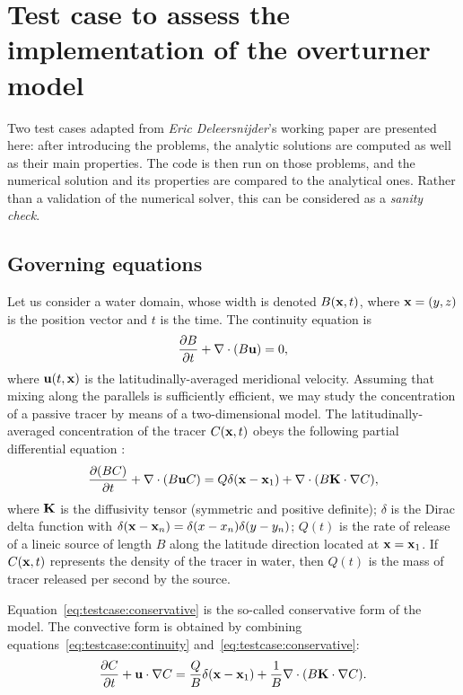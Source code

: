 \section{Test case to assess the implementation of the overturner model} \label{app:test_case}
Two test cases adapted from \textit{Eric Deleersnijder}'s working paper \cite{deleersnijder2011test} are presented here: after introducing the problems, the analytic solutions are computed as well as their main properties. The code is then run on those problems, and the numerical solution and its properties are compared to the analytical ones. Rather than a validation of the numerical solver, this can be considered as a \textit{sanity check}.

\subsection{Governing equations}
Let us consider a water domain, whose width is denoted $B(\mathbf{x},t)$, where $\mathbf{x} = (y,z)$ is the position vector and $t$ is the time. The continuity equation is
\begin{equation} \label{eq:testcase:continuity}
	\frac{\partial B}{\partial t} + \nabla \cdot (B\mathbf{u}) = 0,
\end{equation}
where $\mathbf{u}(t,\mathbf{x})$ is the latitudinally-averaged meridional velocity. Assuming that mixing along the parallels is sufficiently efficient, we may study the concentration of a passive tracer by means of a two-dimensional model. The latitudinally-averaged concentration of the tracer $C(\mathbf x, t)$ obeys the following partial differential equation :
\begin{equation} \label{eq:testcase:conservative}
	\frac{\partial (BC)}{\partial t} + \nabla \cdot (B \mathbf{u} C) = Q\delta(\mathbf{x} - \mathbf{x}_1) + \nabla \cdot (B\mathbf{K} \cdot \nabla C), 
\end{equation}
where $\mathbf{K}$ is the diffusivity tensor (symmetric and positive definite); $\delta$ is the Dirac delta function with $\delta(\mathbf{x}-\mathbf{x}_n) = \delta(x-x_n)\delta(y-y_n)$; $Q(t)$ is the rate of release of a lineic source of length $B$ along the latitude direction located at $\mathbf{x} = \mathbf{x}_1$. If $C(\mathbf x,t)$ represents the 
density of the tracer in water, then $Q(t)$ is the mass of tracer released per second by the source.

Equation~\eqref{eq:testcase:conservative} is the so-called conservative form of the model. The convective form is obtained by combining equations~\eqref{eq:testcase:continuity} and~\eqref{eq:testcase:conservative}:
\begin{equation}  \label{eq:testcase:convective}
	\frac{\partial C}{\partial t} + \mathbf{u} \cdot \nabla C = \frac{Q}{B} \delta(\mathbf{x} - \mathbf{x}_1) + \frac{1}{B} \nabla \cdot (B\mathbf{K} \cdot \nabla C).
\end{equation}

